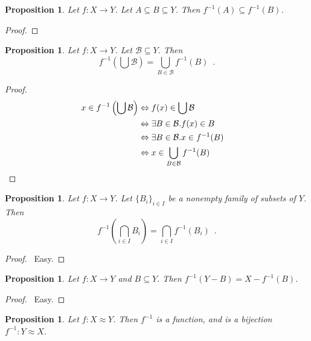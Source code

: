 \documentclass{report}
\let\qed\relax
\newtheorem{prop}[ax]{Proposition}
\theoremstyle{definition}
\begin{document}
\begin{prop}
Let $f : X \rightarrow Y$. Let $A \subseteq B \subseteq Y$. Then $f^{-1}(A) \subseteq f^{-1}(B)$.
\end{prop}

\begin{proof}
\pf
{}
\qed
\end{proof}

\begin{prop}
Let $f : X \rightarrow Y$. Let $\mathcal{B} \subseteq Y$. Then
\[ f^{-1} \left( \bigcup \mathcal{B} \right) = \bigcup_{B \in \mathcal{B}} f^{-1}(B) \enspace . \]
\end{prop}

\begin{proof}
\pf
\begin{align*}
x \in f^{-1} \left( \bigcup \mathcal{B} \right)
& \Leftrightarrow f(x) \in \bigcup \mathcal{B} \\
& \Leftrightarrow \exists B \in \mathcal{B}. f(x) \in B \\
& \Leftrightarrow \exists B \in \mathcal{B}. x \in f^{-1}(B) \\
& \Leftrightarrow x \in \bigcup_{B \in \mathcal{B}} f^{-1}(B) & \qed
\end{align*}
\end{proof}

\begin{prop}
Let $f : X \rightarrow Y$. Let $\{B_i\}_{i \in I}$ be a nonempty family of subsets of $Y$. Then
\[ f^{-1} \left( \bigcap_{i \in I} B_i \right) = \bigcap_{i \in I} f^{-1}(B_i) \enspace . \]
\end{prop}

\begin{proof}
\pf\ Easy. \qed
\end{proof}

\begin{prop}
Let $f : X \rightarrow Y$ and $B \subseteq Y$. Then $f^{-1}(Y - B) = X - f^{-1}(B)$.
\end{prop}

\begin{proof}
\pf\ Easy. \qed
\end{proof}

\begin{prop}
Let $f : X \approx Y$. Then $f^{-1}$ is a function, and is a bijection $f^{-1} : Y \approx X$.
\end{prop}
\end{document}
